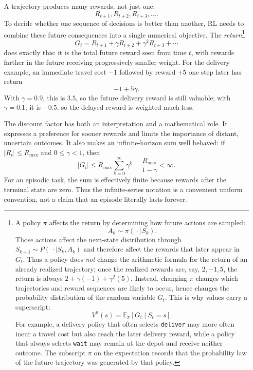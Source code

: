 \documentclass[11pt,a4paper]{article}
\theoremstyle{definition}
\begin{document}
\begin{note}
A trajectory produces many rewards, not just one:
\[
R_{t+1},R_{t+2},R_{t+3},\ldots.
\]
To decide whether one sequence of decisions is better than another, RL needs to combine these
future consequences into a single numerical objective. The \emph{return}\footnote{A policy
$\pi$ affects the return by determining how future actions are sampled:
\[
A_k\sim\pi(\,\cdot\mid S_k).
\]
Those actions affect the next-state distribution through
$S_{k+1}\sim P(\,\cdot\mid S_k,A_k)$ and therefore affect the rewards that later appear in
$G_t$. Thus a policy does \emph{not} change the arithmetic formula for the return of an
already realized trajectory; once the realized rewards are, say, $2,-1,5$, the return is
always $2+\gamma(-1)+\gamma^2(5)$. Instead, changing $\pi$ changes which trajectories and
reward sequences are likely to occur, hence changes the probability distribution of the
random variable $G_t$. This is why values carry a superscript:
\[
V^\pi(s)=\mathbb{E}_\pi[G_t\mid S_t=s].
\]
For example, a delivery policy that often selects \texttt{deliver} may more often incur a
travel cost but also reach the later delivery reward, while a policy that always selects
\texttt{wait} may remain at the depot and receive neither outcome. The subscript $\pi$ on
the expectation records that the probability law of the future trajectory was generated by
that policy.}
\[
G_t=R_{t+1}+\gamma R_{t+2}+\gamma^2R_{t+3}+\cdots
\]
does exactly this: it is the total future reward seen from time $t$, with rewards farther in
the future receiving progressively smaller weight. For the delivery example, an immediate
travel cost $-1$ followed by reward $+5$ one step later has return
\[
-1+5\gamma.
\]
With $\gamma=0.9$, this is $3.5$, so the future delivery reward is still valuable; with
$\gamma=0.1$, it is $-0.5$, so the delayed reward is weighted much less.

The discount factor has both an interpretation and a mathematical role. It expresses a
preference for sooner rewards and limits the importance of distant, uncertain outcomes.
It also makes an infinite-horizon sum well behaved: if $|R_t|\leq R_{\max}$ and
$0\leq\gamma<1$, then
\[
|G_t|
\leq R_{\max}\sum_{k=0}^{\infty}\gamma^k
=\frac{R_{\max}}{1-\gamma}<\infty.
\]
For an episodic task, the sum is effectively finite because rewards after the terminal state
are zero. Thus the infinite-series notation is a convenient uniform convention, not a claim
that an episode literally lasts forever.


\end{note}
\end{document}
